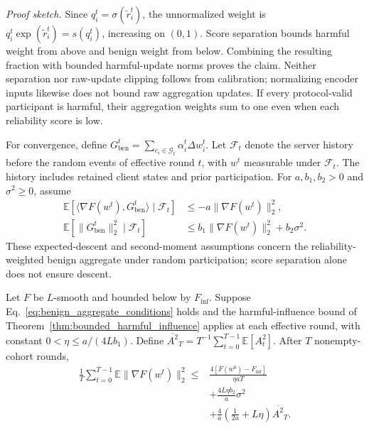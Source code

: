 \noindent\textit{Proof sketch.} Since $q_i^t=\sigma(\widetilde r_i^t)$, the unnormalized weight is $q_i^t\exp(\widetilde r_i^t)=s(q_i^t)$, increasing on $(0,1)$. Score separation bounds harmful weight from above and benign weight from below. Combining the resulting fraction with bounded harmful-update norms proves the claim. Neither separation nor raw-update clipping follows from calibration; normalizing encoder inputs likewise does not bound raw aggregation updates. If every protocol-valid participant is harmful, their aggregation weights sum to one even when each reliability score is low.

For convergence, define $G_{\mathrm{ben}}^t=\sum_{c_i\in\mathcal{G}_t}\alpha_i^t\Delta w_i^t$. Let $\mathcal{F}_t$ denote the server history before the random events of effective round $t$, with $w^t$ measurable under $\mathcal{F}_t$. The history includes retained client states and prior participation. For $a,b_1,b_2>0$ and $\sigma^2\geq0$, assume
\begin{equation}
\begin{aligned}
\mathbb{E}[\langle\nabla F(w^t),G_{\mathrm{ben}}^t\rangle\mid\mathcal{F}_t]&\leq-a\|\nabla F(w^t)\|_2^2,\\
\mathbb{E}[\|G_{\mathrm{ben}}^t\|_2^2\mid\mathcal{F}_t]&\leq b_1\|\nabla F(w^t)\|_2^2+b_2\sigma^2.
\end{aligned}
\label{eq:benign_aggregate_conditions}
\end{equation}
These expected-descent and second-moment assumptions concern the reliability-weighted benign aggregate under random participation; score separation alone does not ensure descent.

\begin{theorem}
\label{thm:trajrep_stationarity}
Let $F$ be $L$-smooth and bounded below by $F_{\inf}$. Suppose Eq.~\eqref{eq:benign_aggregate_conditions} holds and the harmful-influence bound of Theorem~\ref{thm:bounded_harmful_influence} applies at each effective round, with constant $0<\eta\leq a/(4Lb_1)$. Define $\overline{A^2}_T=T^{-1}\sum_{t=0}^{T-1}\mathbb{E}[A_t^2]$. After $T$ nonempty-cohort rounds,
\begin{equation}
\begin{aligned}
\frac{1}{T}\sum_{t=0}^{T-1}\mathbb{E}\|\nabla F(w^t)\|_2^2\leq{}&\frac{4[F(w^0)-F_{\inf}]}{\eta aT}\\
&+\frac{4L\eta b_2}{a}\sigma^2\\
&+\frac{4}{a}\left(\frac{1}{2a}+L\eta\right)\overline{A^2}_T.
\end{aligned}
\label{eq:stationarity_main}
\end{equation}
\end{theorem}

